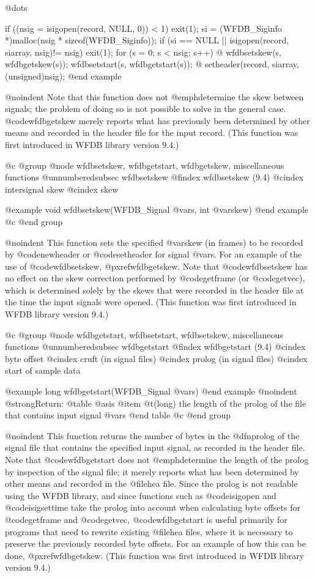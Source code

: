 {{{{{{{{{@dots{}

if ((nsig = isigopen(record, NULL, 0)) < 1)
    exit(1);
si = (WFDB_Siginfo *)malloc(nsig * sizeof(WFDB_Siginfo));
if (si == NULL || isigopen(record, siarray, nsig)!= nsig)
    exit(1);
for (s = 0; s < nsig; s++) @{
    wfdbsetskew(s, wfdbgetskew(s));
    wfdbsetstart(s, wfdbgetstart(s));
@}
setheader(record, siarray, (unsigned)nsig);
@end example

@noindent
Note that this function does not @emph{determine} the skew between
signals;  the problem of doing so is not possible to solve in the
general case.  @code{wfdbgetskew} merely reports what has previously been
determined by other means and recorded in the header file for the input
record.  (This function was first introduced in WFDB library version 9.4.)

@c @group
@node     wfdbsetskew, wfdbgetstart, wfdbgetskew, miscellaneous functions
@unnumberedsubsec wfdbsetskew
@findex wfdbsetskew (9.4)
@cindex intersignal skew
@cindex skew

@example
void wfdbsetskew(WFDB_Signal @var{s}, int @var{skew})
@end example
@c @end group

@noindent
This function sets the specified @var{skew} (in frames) to be recorded
by @code{newheader} or @code{setheader} for signal @var{s}.  For an
example of the use of @code{wfdbsetskew}, @pxref{wfdbgetskew}.  Note that
@code{wfdbsetskew} has no effect on the skew correction performed by
@code{getframe} (or @code{getvec}), which is determined solely by the
skews that were recorded in the header file at the time the input
signals were opened.  (This function was first introduced in WFDB library
version 9.4.)

@c @group
@node     wfdbgetstart, wfdbsetstart, wfdbsetskew, miscellaneous functions
@unnumberedsubsec wfdbgetstart
@findex wfdbgetstart (9.4)
@cindex byte offset
@cindex cruft (in signal files)
@cindex prolog (in signal files)
@cindex start of sample data

@example
long wfdbgetstart(WFDB_Signal @var{s})
@end example
@noindent
@strong{Return:}
@table @asis
@item @t{(long)}
the length of the prolog of the file that contains input signal @var{s}
@end table
@c @end group

@noindent
This function returns the number of bytes in the @dfn{prolog} of the
signal file that contains the specified input signal, as recorded in the
header file.  Note that @code{wfdbgetstart} does not
@emph{determine} the length of the prolog by inspection of the signal
file; it merely reports what has been determined by other means and
recorded in the @file{hea} file.  Since the prolog is not readable
using the WFDB library, and since functions such as @code{isigopen} and
@code{isigsettime} take the prolog into account when calculating byte
offsets for @code{getframe} and @code{getvec}, @code{wfdbgetstart} is
useful primarily for programs that need to rewrite existing
@file{hea} files, where it is necessary to preserve the previously
recorded byte offsets.  For an example of how this can be done,
@pxref{wfdbgetskew}.  (This function was first introduced in WFDB library
version 9.4.)

}}}}}}}}}
